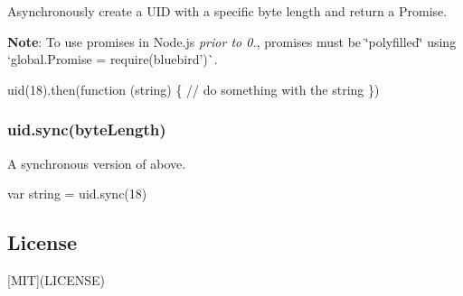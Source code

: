 Asynchronously create a U\+ID with a specific byte length and return a {\ttfamily Promise}.

{\bfseries Note}\+: To use promises in Node.\+js {\itshape prior to 0.}, promises must be \char`\"{}polyfilled\char`\"{} using `global.\+Promise = require(\textquotesingle{}bluebird')\`{}.


\begin{DoxyCode}
uid(18).then(function (string) \{
  // do something with the string
\})
\end{DoxyCode}


\subsubsection*{uid.\+sync(byte\+Length)}

A synchronous version of above.


\begin{DoxyCode}
var string = uid.sync(18)
\end{DoxyCode}


\subsection*{License}

\mbox{[}M\+IT\mbox{]}(L\+I\+C\+E\+N\+SE) 